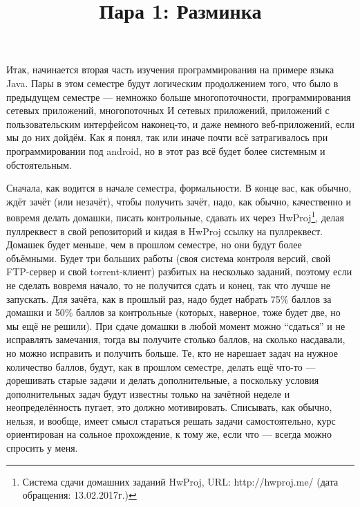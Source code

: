 \documentclass[a5paper]{article}
\title{Пара 1: Разминка}
\date{}
\begin{document}
\maketitle
\thispagestyle{empty}

Итак, начинается вторая часть изучения программирования на примере языка Java. Пары в этом семестре будут логическим продолжением того, что было в предыдущем семестре --- немножко больше многопоточности, программирования сетевых приложений, многопоточных И сетевых приложений, приложений с пользовательским интерфейсом наконец-то, и даже немного веб-приложений, если мы до них дойдём. Как я понял, так или иначе почти всё затрагивалось при программировании под android, но в этот раз всё будет более системным и обстоятельным.

Сначала, как водится в начале семестра, формальности. В конце вас, как обычно, ждёт зачёт (или незачёт), чтобы получить зачёт, надо, как обычно, качественно и вовремя делать домашки, писать контрольные, сдавать их через HwProj\footnote{Система сдачи домашних заданий HwProj, URL: http://hwproj.me/ (дата обращения: 13.02.2017г.)}, делая пуллреквест в свой репозиторий и кидая в HwProj ссылку на пуллреквест. Домашек будет меньше, чем в прошлом семестре, но они будут более объёмными. Будет три больших работы (своя система контроля версий, свой FTP-сервер и свой torrent-клиент) разбитых на несколько заданий, поэтому если не сделать вовремя начало, то не получится сдать и конец, так что лучше не запускать. Для зачёта, как в прошлый раз, надо будет набрать 75\% баллов за домашки и 50\% баллов за контрольные (которых, наверное, тоже будет две, но мы ещё не решили). При сдаче домашки в любой момент можно ``сдаться'' и не исправлять замечания, тогда вы получите столько баллов, на сколько насдавали, но можно исправить и получить больше. Те, кто не нарешает задач на нужное количество баллов, будут, как в прошлом семестре, делать ещё что-то --- дорешивать старые задачи и делать дополнительные, а поскольку условия дополнительных задач будут известны только на зачётной неделе и неопределённость пугает, это должно мотивировать. Списывать, как обычно, нельзя, и вообще, имеет смысл стараться решать задачи самостоятельно, курс ориентирован на сольное прохождение, к тому же, если что --- всегда можно спросить у меня.
\end{document}
